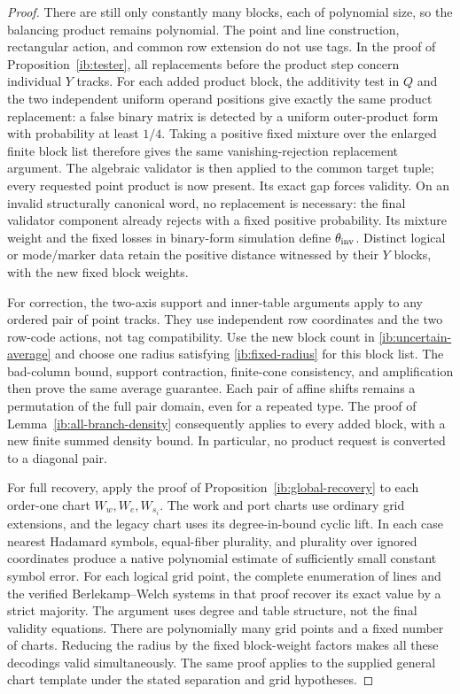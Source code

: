 \begin{proof}
There are still only constantly many blocks, each of polynomial
size, so the balancing product remains polynomial. The point and
line construction, rectangular action, and common row extension do
not use tags. In the proof of Proposition~\ref{ib:tester}, all
replacements before the product step concern individual \(Y\)
tracks. For each added product block, the additivity test in \(Q\)
and the two independent uniform operand positions give exactly the
same product replacement: a false binary matrix is detected by a
uniform outer-product form with probability at least \(1/4\).
Taking a positive fixed mixture over the enlarged finite block list
therefore gives the same vanishing-rejection replacement argument.
The algebraic validator is then applied to the common target tuple;
every requested point product is now present. Its exact gap forces
validity. On an invalid structurally canonical word, no replacement
is necessary: the final validator component already rejects with a
fixed positive probability. Its mixture weight and the fixed losses
in binary-form simulation define \(\theta_{\rm inv}\). Distinct
logical or mode/marker data retain the positive distance witnessed
by their \(Y\) blocks, with the new fixed block weights.

For correction, the two-axis support and inner-table arguments
apply to any ordered pair of point tracks. They use independent
row coordinates and the two row-code actions, not tag compatibility.
Use the new block count in \eqref{ib:uncertain-average} and choose
one radius satisfying \eqref{ib:fixed-radius} for this block list.
The bad-column bound, support contraction, finite-cone consistency,
and amplification then prove the same average guarantee. Each pair
of affine shifts remains a permutation of the full pair domain,
even for a repeated type. The proof of
Lemma~\ref{ib:all-branch-density} consequently applies to every
added block, with a new finite summed density bound. In particular,
no product request is converted to a diagonal pair.

For full recovery, apply the proof of
Proposition~\ref{ib:global-recovery} to each order-one chart
\(W_w,W_e,W_{s_i}\). The work and port charts use ordinary grid
extensions, and the legacy chart uses its degree-in-bound cyclic
lift. In each case nearest Hadamard symbols, equal-fiber plurality,
and plurality over ignored coordinates produce a native polynomial
estimate of sufficiently small constant symbol error. For each
logical grid point, the complete enumeration of lines and the
verified Berlekamp--Welch systems in that proof recover its exact
value by a strict majority. The argument uses degree and table
structure, not the final validity equations. There are polynomially
many grid points and a fixed number of charts. Reducing the radius
by the fixed block-weight factors makes all these decodings valid
simultaneously. The same proof applies to the supplied general
chart template under the stated separation and grid hypotheses.
\end{proof}

